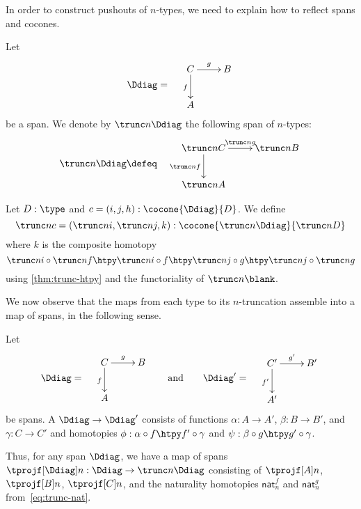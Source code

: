 In order to construct pushouts of $n$-types, we need to explain how to reflect spans and cocones.

\bgroup
\def\reflect(#1){\trunc n{#1}}

\begin{defn}
  Let
  \[\Ddiag=\quad\vcenter{\xymatrix{C \ar^g[r] \ar_f[d] & B \\ A & }}\]
  be a span. We denote by $\reflect(\Ddiag)$ the following
  span of $n$-types:
  \[\reflect(\Ddiag)\defeq\quad \vcenter{\xymatrix{\reflect(C) \ar^{\reflect(g)}[r]
      \ar_{\reflect(f)}[d] & \reflect(B) \\ \reflect(A) & }}\]
\end{defn}

\begin{defn}
  Let $D:\type$ and $c=(i,j,h):\cocone{\Ddiag}{D}$.
  We define
  \[\reflect(c)=(\reflect(i),\reflect(j),k):
  \cocone{\reflect(\Ddiag)}{\reflect(D)}\]
  where $k$ is the composite homotopy
  \[ \reflect(i) \circ \reflect(f) \htpy \reflect(i\circ f) \htpy \reflect(j\circ g) \htpy \reflect(j) \circ \reflect(g) \]
  using \cref{thm:trunc-htpy} and the functoriality of $\reflect(\blank)$.
\end{defn}

\egroup

We now observe that the maps from each type to its $n$-truncation assemble into a map of spans, in the following sense.

\begin{defn}
  Let
  \[\Ddiag=\quad\vcenter{\xymatrix{C \ar^g[r] \ar_f[d] & B \\ A & }}
  \qquad\text{and}\qquad
  \Ddiag'=\quad\vcenter{\xymatrix{C' \ar^{g'}[r] \ar_{f'}[d] & B' \\ A' & }}
  \]
  be spans.
  A 
  $\Ddiag \to \Ddiag'$ consists of functions $\alpha:A\to A'$, $\beta:B\to B'$, and $\gamma:C\to C'$ and homotopies $\phi: \alpha\circ f \htpy f'\circ \gamma$ and $\psi:\beta\circ g \htpy g' \circ \gamma$.
\end{defn}

Thus, for any span $\Ddiag$, we have a map of spans $\tprojf[\Ddiag] n : \Ddiag \to \trunc n\Ddiag$ consisting of $\tprojf[A]n$, $\tprojf[B]n$, $\tprojf[C]n$, and the naturality homotopies $\mathsf{nat}^f_n$ and $\mathsf{nat}^g_n$ from~\eqref{eq:trunc-nat}.

